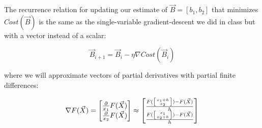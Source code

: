 \documentclass[titlepage]{tufte-book}
\begin{document}
\begin{fullwidth}

The recurrence relation for updating our estimate of $\vec{B}=[b_1, b_2]$ that minimizes $Cost(\vec{B})$ is the same as the single-variable gradient-descent we did in class but with a vector instead of a scalar:

\[
\vec{B}_{i+1} = \vec{B}_i - \eta \nabla Cost(\vec{B}_i)
\]

\noindent where we will approximate vectors of partial derivatives with partial finite differences:

\[
\nabla F(\vec{X}) =
\begin{bmatrix}
\frac{\partial}{x_1}{F(\vec{X})}\\
\frac{\partial}{x_2}{F(\vec{X})} \\
\end{bmatrix}
\approx
\begin{bmatrix}
\frac{F(\left[ x_1+h \above 0pt{x_2} \right]) - F(\vec{X})}{h} \\
\frac{F(\left[ x_1 \above 0pt{x_2+h} \right]) - F(\vec{X})}{h} \\
\end{bmatrix}
\]


\end{fullwidth}
\end{document}
